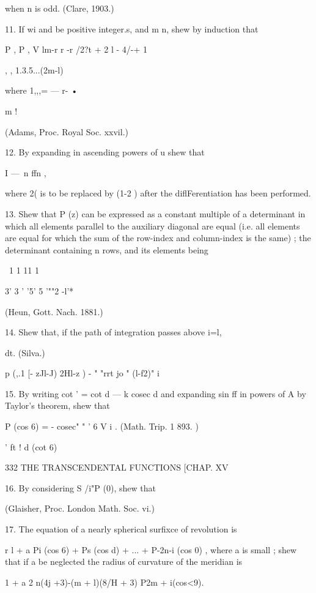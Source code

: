 {{{{when n is odd. (Clare, 1903.) 

11. If wi and   be positive integer.s, and m n, shew by induction that 

P  ,  P  ,  V  lm-r r  -r /2?t + 2  l - 4/-+ 1 \ 

, , 1.3.5...(2m-l) 

where  1,,,= — r- • 

m ! 

(Adams, Proc. Royal Soc. xxvil.) 

12. By expanding in ascending powers of u shew that 

I —\ n ffn , 

where 2(  is to be replaced by (1-2 ) after the diflFerentiation has been performed. 

13. Shew that P  (z) can be expressed as a constant multiple of a determinant in 
which all elements parallel to the auxiliary diagonal are equal (i.e. all elements are equal 
for which the sum of the row-index and column-index is the same) ; the determinant 
containing n rows, and its elements being 

\ 1 1 11 1 

3' 3 ' '5' 5 '""2 -l'* 

(Heun, Gott. Nach. 1881.) 

14. Shew that, if the path of integration passes above i=l, 

dt. (Silva.) 



p (,.1 [- zJl-J) 2Hl-z )  - 
 " "rrt jo " (l-f2)" i 

15. By writing cot  ' = cot d — k cosec d and expanding sin ff in powers of A by Taylor's 
theorem, shew that 

P  (cos 6) =  -  cosec" "  ' 6  V  i . (Math. Trip. 1 893. ) 

' ft ! d (cot 6)  



332 THE TRANSCENDENTAL FUNCTIONS [CHAP. XV 

16. By considering S /i"P (0), shew that 

(Glaisher, Proc. London Math. Soc. vi.) 

17. The equation of a nearly spherical surfixce of revolution is 

r l + a Pi (cos 6) + Ps (cos d) + ... + P-2n-i (cos 0) , 
where a is small ; shew that if a  be neglected the radius of curvature of the meridian is 

1 + a 2  n(4j +3)-(m + l)(8/H + 3) P2m + i(cos<9). 

}}}}
